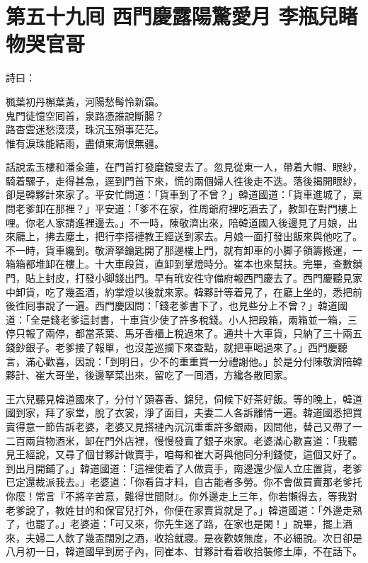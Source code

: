 
\chapter*{第五十九囘 西門慶露陽驚愛月 李瓶兒睹物哭官哥}


詩曰：

\begin{myquote} 
楓葉初丹槲葉黃，河陽愁髩怜新霜。\\鬼門徒憶空囘首，泉路憑誰說斷腸？\\路杳雲迷愁漠漠，珠沉玉殞事茫茫。\\惟有淚珠能結雨，盡傾東海恨無疆。
\end{myquote} 

話說孟玉樓和潘金蓮，在門首打發磨鏡叟去了。忽見從東一人，帶着大帽、眼紗，騎着騾子，走得甚急，逕到門首下來，慌的兩個婦人徃後走不迭。落後揭開眼紗，卻是韓夥計來家了。平安忙問道：「貨車到了不曾？」韓道國道：「貨車進城了，稟問老爹卸在那裡？」平安道：「爹不在家，徃周爺府裡吃酒去了，教卸在對門樓上哩。你老人家請進裡邊去。」不一時，陳敬濟出來，陪韓道國入後邊見了月娘，出來廳上，拂去塵土，把行李搭褳教王經送到家去。月娘一面打發出飯來與他吃了。不一時，貨車纔到。敬濟拏鑰匙開了那邊樓上門，就有卸車的小脚子領籌搬運，一箱箱都堆卸在樓上。十大車段貨，直卸到掌燈時分。崔本也來幫扶。完畢，查數鎖門，貼上封皮，打發小脚錢出門。早有玳安徃守備府報西門慶去了。西門慶聽見家中卸貨，吃了幾盃酒，約掌燈以後就來家。韓夥計等着見了，在廳上坐的，悉把前後徃囘事說了一遍。西門慶因問：「錢老爹書下了，也見些分上不曾？」韓道國道：「全是錢老爹這封書，十車貨少使了許多稅錢。小人把段箱，兩箱並一箱，三停只報了兩停，都當茶葉、馬牙香櫃上稅過來了。通共十大車貨，只納了三十兩五錢鈔銀子。老爹接了報單，也沒差巡攔下來查點，就把車喝過來了。」西門慶聽言，滿心歡喜，{}因說：「到明日，少不的重重買一分禮謝他。」於是分付陳敬濟陪韓夥計、崔大哥坐，後邊拏菜出來，留吃了一囘酒，方纔各散囘家。

王六兒聽見韓道國來了，分付丫頭春香、錦兒，伺候下好茶好飯。等的晚上，韓道國到家，拜了家堂，脫了衣裳，淨了面目，夫妻二人各訴離情一遍。韓道國悉把買賣得意一節告訴老婆，老婆又見搭褳內沉沉重重許多銀兩，因問他，替己又帶了一二百兩貨物酒米，卸在門外店裡，慢慢發賣了銀子來家。老婆滿心歡喜道：「我聽見王經說，又尋了個甘夥計做賣手，咱每和崔大哥與他同分利錢使，這個又好了。到出月開鋪了。」韓道國道：「這裡使着了人做賣手，南邊還少個人立庄置貨，老爹已定還裁派我去。」老婆道：「你看貨才料，自古能者多勞。你不會做買賣那老爹托你麼！常言『不將辛苦意，難得世間財』。你外邊走上三年，你若懶得去，等我對老爹說了，教姓甘的和保官兒打外，你便在家賣貨就是了。」韓道國道：「外邊走熟了，也罷了。」老婆道：「可又來，你先生迷了路，在家也是閑！」說畢，擺上酒來，夫婦二人飲了幾盃闊別之酒，收拾就寢。是夜歡娛無度，不必細說。次日卻是八月初一日，韓道國早到房子內，同崔本、甘夥計看着收拾裝修土庫，不在話下。


